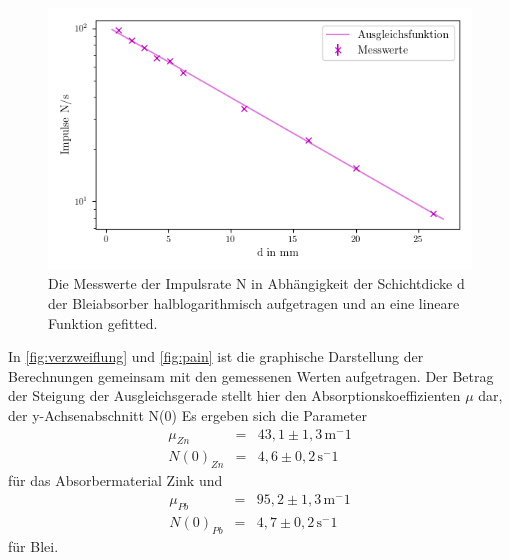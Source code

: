 \begin{figure}[H]
  \centering
  \includegraphics{content/pain.png}
  \caption{Die Messwerte der Impulsrate N in Abhängigkeit der 
  Schichtdicke d der Bleiabsorber halblogarithmisch aufgetragen und an eine lineare Funktion gefitted.}
  \label{fig:pain}
\end{figure}
In \autoref{fig:verzweiflung} und  \autoref{fig:pain} ist die graphische Darstellung der Berechnungen gemeinsam mit den 
gemessenen Werten aufgetragen. Der Betrag der Steigung der Ausgleichsgerade stellt hier den Absorptionskoeffizienten $\mu$ dar,
der y-Achsenabschnitt N(0) Es ergeben sich die Parameter 
\begin{eqnarray}
  \mu_{Zn} &=&  43,1 \pm 1,3\,  \mathrm{m^-1} \nonumber \\
  N(0)_{Zn} &=& 4,6 \pm 0,2 \, \mathrm{s^-1} \nonumber
\end{eqnarray}
für das Absorbermaterial Zink und 
\begin{eqnarray}
  \mu_{Pb} &=&  95,2 \pm 1,3 \,  \mathrm{m^-1} \nonumber \\
  N(0)_{Pb} &=& 4,7 \pm 0,2 \, \mathrm{s^-1} \nonumber
\end{eqnarray}
für Blei. \\



%


